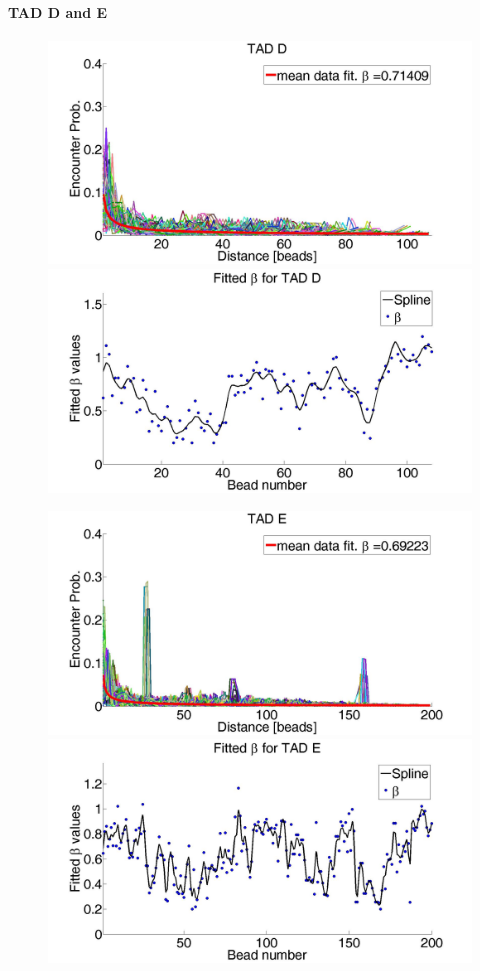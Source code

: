 \documentclass[8pt]{beamer}
\begin{document}
\begin{frame}
\framesubtitle{TAD D and E}
\begin{figure}[H]
\includegraphics[scale=0.1]{meanDataFitTADD}
\includegraphics[scale=0.1]{fittedExpValuesWithSplineAverageTADD}
\end{figure}

\begin{figure}[H]
\includegraphics[scale=0.1]{meanDataFitTADE}
\includegraphics[scale=0.1]{fittedExpValuesWithSplineAverageTADE}
\end{figure}


\end{frame}
\end{document}
